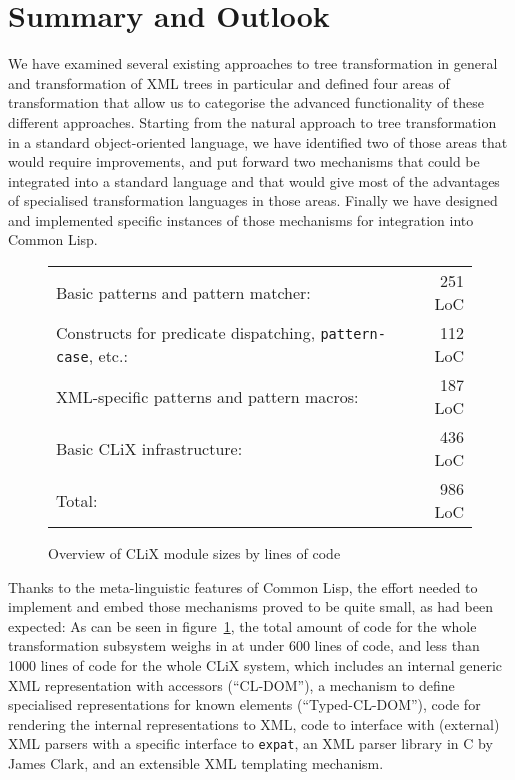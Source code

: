 \documentclass[a4paper,11pt]{scrartcl}
\begin{document}
\section{Summary and Outlook}
\label{sec:summary}

We have examined several existing approaches to tree transformation in
general and transformation of XML trees in particular and defined
four areas of transformation that allow us to categorise the advanced
functionality of these different approaches.  Starting from the
natural approach to tree transformation in a standard object-oriented
language, we have identified two of those areas that would require
improvements, and put forward two mechanisms that could be integrated
into a standard language and that would give most of the advantages of
specialised transformation languages in those areas.  Finally we have
designed and implemented specific instances of those mechanisms for
integration into Common Lisp.

\begin{figure}[htbp]
  \begin{center}
    \begin{tabular}{lr}
      Basic patterns and pattern matcher: & 251 LoC\\
      Constructs for predicate dispatching, \texttt{pattern-case},
      etc.: & 112 LoC\\ 
      XML-specific patterns and pattern macros: & 187 LoC\\
      Basic CLiX infrastructure: & 436 LoC\\
      \hline
      Total: & 986 LoC
    \end{tabular}
    \caption{Overview of CLiX module sizes by lines of code}
    \label{fig:loc}
  \end{center}
\end{figure}

Thanks to the meta-linguistic features of Common Lisp, the effort
needed to implement and embed those mechanisms proved to be quite
small, as had been expected:  As can be seen in figure~\ref{fig:loc},
the total amount of code for the whole transformation subsystem weighs
in at under 600 lines of code, and less than 1000 lines of code for
the whole CLiX system, which includes an internal generic XML
representation with accessors (``CL-DOM''), a mechanism to define
specialised representations for known elements (``Typed-CL-DOM''),
code for rendering the internal representations to XML, code to
interface with (external) XML parsers with a specific interface to
\texttt{expat}, an XML parser library in C by James Clark, and an
extensible XML templating mechanism.
\end{document}
